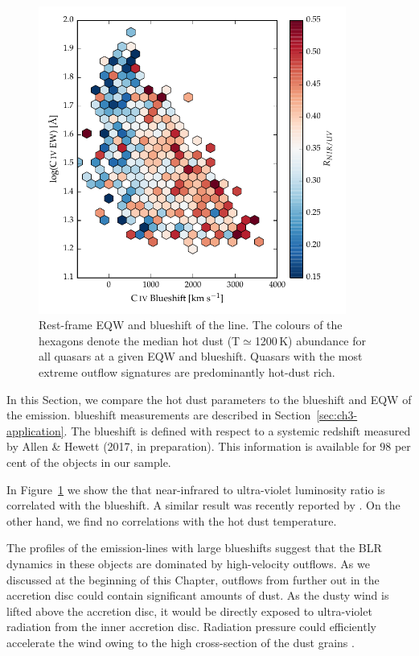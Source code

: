\begin{figure}[t!]
\centering
  \includegraphics[width=0.9\textwidth]{figures/chapter05/hot_dust_ratio.pdf}
\caption[{Hot dust abundance as a function of rest-frame EQW and blueshift of the  line.}]{Rest-frame EQW and blueshift of the  line. The colours of the hexagons denote the median hot dust (T$\simeq$1200\,K) abundance for all quasars at a given EQW and blueshift. Quasars with the most extreme outflow signatures are predominantly hot-dust rich.}
  \label{fig:civ_hot_dust}
\end{figure}

In this Section, we compare the hot dust parameters to the blueshift and EQW of the  emission. 
 blueshift measurements are described in Section~\ref{sec:ch3-application}. 
The  blueshift is defined with respect to a systemic redshift measured by Allen \& Hewett (2017, in preparation). 
This information is available for $98$ per cent of the objects in our sample. 

In Figure~\ref{fig:civ_hot_dust} we show the that near-infrared to ultra-violet luminosity ratio is correlated with the  blueshift. 
A similar result was recently reported by \citet{wang13}. 
On the other hand, we find no correlations with the hot dust temperature. 

The profiles of the emission-lines with large  blueshifts suggest that the BLR dynamics in these objects are dominated by high-velocity outflows. 
As we discussed at the beginning of this Chapter, outflows from further out in the accretion disc could contain significant amounts of dust. 
As the dusty wind is lifted above the accretion disc, it would be directly exposed to ultra-violet radiation from the inner accretion disc. 
Radiation pressure could efficiently accelerate the wind owing to the high cross-section of the dust grains \citep[e.g.][]{fabian12}.  


